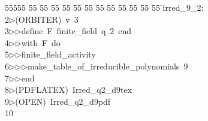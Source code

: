 %
%
\begin{tabbing}
55555 \= 55 \= 55 \= 55 \= 55 \= 55 \= 55 \= 55 \= 55 \= 55 \= 55 \= 55 \= 55 \= \>irred\_9\_2:\\[0pt]
2\>$\triangleright$\>(ORBITER)\ v\ 3\ \\[0pt]
3\>$\triangleright$\>$\triangleright$\>define\ F\ finite\_field\ q\ 2\ end\ \\[0pt]
4\>$\triangleright$\>$\triangleright$\>with\ F\ do\ \\[0pt]
5\>$\triangleright$\>$\triangleright$\>finite\_field\_activity\ \\[0pt]
6\>$\triangleright$\>$\triangleright$\>$\triangleright$\>make\_table\_of\_irreducible\_polynomials\ 9\ \\[0pt]
7\>$\triangleright$\>$\triangleright$\>end\\[0pt]
8\>$\triangleright$\>(PDFLATEX)\ Irred\_q2\_d9tex\\[0pt]
9\>$\triangleright$\>(OPEN)\ Irred\_q2\_d9pdf\\[0pt]
10\>\end{tabbing}
